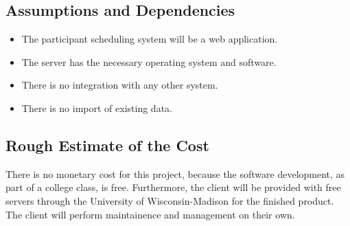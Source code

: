 \documentclass{article}
\begin{document}
\subsection{Assumptions and Dependencies}
\begin{itemize}
\item The participant scheduling system will be a web application.
\item The server has the necessary operating system and software.
\item There is no integration with any other system.
\item There is no import of existing data.
\end{itemize}
\subsection{Rough Estimate of the Cost}
There is no monetary cost for this project, because the software development, as part of a college class, is free. Furthermore, the client will be provided with free servers through the University of Wisconsin-Madison for the finished product. The client will perform maintainence and management on their own.
\end{document}
